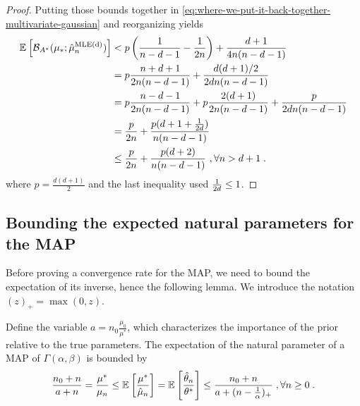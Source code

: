 \documentclass[twoside]{article}
\newcommand*{\expect}[2][]{\ensuremath{\mathbb{E}_{#1} \left[ #2 \right] }} %
\newcommand{\logpart}{A}
\newcommand{\bregmanconj}{\cB_{\logpart^*}}
\newcommand{\nat}{\theta}
\newcommand{\m}{\mu}
\newcommand{\MAPm}{\hat \m_n}
\newcommand{\MAPt}{\hat \nat_n}
\begin{document}
\begin{proof}
Putting those bounds together in 
\cref{eq:where-we-put-it-back-together-multivariate-gaussian}
and reorganizing yields
\begin{align}
 	\expect{\bregmanconj( \mu_*; \hat \mu_n^\text{MLE(d)})}
 	&< p \paren{ \inv{n-d-1} - \inv{2n}}  + \frac{d + 1}{4n(n - d - 1)}\\
 	&= p \frac{n + d +1}{2 n (n-d-1)}  + \frac{d(d + 1)/2}{2dn(n - d - 1)}\\
 	&= p\frac{n-d-1}{2n(n-d-1)} + p\frac{2(d+1)}{2 n (n-d-1)} + \frac{p}{2dn (n - d - 1)}\\
 	&= \frac{p}{2n} + \frac{p(d+ 1 + \inv{2d})}{n (n-d-1)} \\
 	&\leq \frac{p}{2n} + \frac{p(d+2)}{n (n - d -1)}
 	\ , \forall n >d+1 \;.
\end{align}
where $p = \frac{d(d+1)}{2}$ and the last inequality used $\frac{1}{2d}\leq 1$. 
\end{proof}

\subsection{Bounding the expected natural parameters for the MAP}
\label{app:nat-bound}
Before proving a convergence rate for the MAP, we need to bound the expectation of its inverse, hence the following lemma.
We introduce the notation $(z)_+ = \max(0,z)$.
\begin{lemma}\label{lem:expected-map-natural-parameter-gaussian}
	Define the variable $a = n_0 \frac{\mu_0}{\mu^*}$, which characterizes 
	the importance of the prior relative to the true parameters.
	The expectation of the natural parameter of a MAP of $\Gamma(\alpha,\beta)$ is bounded by
\begin{equation}
		\frac{n_0+n}{a+n}
		=\frac{\mu^*}{\mu_n}
		\leq \expect{\frac{\mu^*}{\MAPm}} 
		= \expect{\frac{\MAPt}{\nat^*}} 
		\leq
		\frac{n_0 +n}{a+(n-\inv{\alpha} )_+} \; , \forall n\geq 0 \; .
		\label{eq:lemma_nat_bound}
	\end{equation}
\end{lemma}
\end{document}
